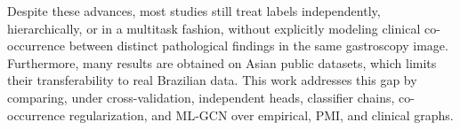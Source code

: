 \documentclass[12pt]{article}
\begin{document}

Despite these advances, most studies still treat labels independently, hierarchically, or in a multitask fashion, without explicitly modeling clinical co-occurrence between distinct pathological findings in the same gastroscopy image. Furthermore, many results are obtained on Asian public datasets, which limits their transferability to real Brazilian data. This work addresses this gap by comparing, under cross-validation, independent heads, classifier chains, co-occurrence regularization, and ML-GCN over empirical, PMI, and clinical graphs.





\end{document}
